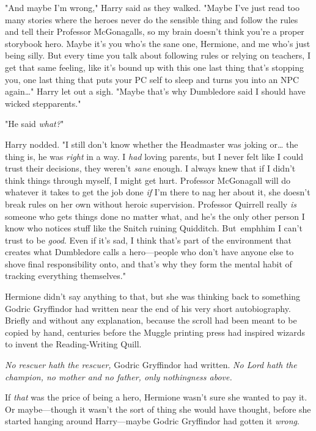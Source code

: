 "And maybe I'm wrong," Harry said as they walked. "Maybe I've just read too 
many stories where the heroes never do the sensible thing and follow the rules 
and tell their Professor McGonagalls, so my brain doesn't think you're a proper 
storybook hero. Maybe it's you who's the sane one, Hermione, and me who's just 
being silly. But every time you talk about following rules or relying on 
teachers, I get that same feeling, like it's bound up with this one last thing 
that's stopping you, one last thing that puts your PC self to sleep and turns 
you into an NPC again{\ldots}" Harry let out a sigh. "Maybe that's why 
Dumbledore said I should have wicked stepparents."

"He said \emph{what?}"

Harry nodded. "I still don't know whether the Headmaster was joking or{\ldots} 
the thing is, he was \emph{right} in a way. I \emph{had} loving parents, but I 
never felt like I could trust their decisions, they weren't \emph{sane} enough. 
I always knew that if I didn't think things through myself, I might get hurt. 
Professor McGonagall will do whatever it takes to get the job done \emph{if} 
I'm there to nag her about it, she doesn't break rules on her own without 
heroic supervision. Professor Quirrell really \emph{is} someone who gets things 
done no matter what, and he's the only other person I know who notices stuff 
like the Snitch ruining Quidditch. But\ emph{him} I can't trust to be 
\emph{good}. Even if it's sad, I think that's part of the environment that 
creates what Dumbledore calls a hero---people who don't have anyone else to 
shove final responsibility onto, and that's why they form the mental habit of 
tracking everything themselves."

Hermione didn't say anything to that, but she was thinking back to something 
Godric Gryffindor had written near the end of his very short autobiography. 
Briefly and without any explanation, because the scroll had been meant to be 
copied by hand, centuries before the Muggle printing press had inspired wizards 
to invent the Reading-Writing Quill.

\emph{No rescuer hath the rescuer,} Godric Gryffindor had written. \emph{No 
Lord hath the champion, no mother and no father, only nothingness above.}

If \emph{that} was the price of being a hero, Hermione wasn't sure she wanted 
to pay it. Or maybe---though it wasn't the sort of thing she would have 
thought, before she started hanging around Harry---maybe Godric Gryffindor had 
gotten it \emph{wrong}.

